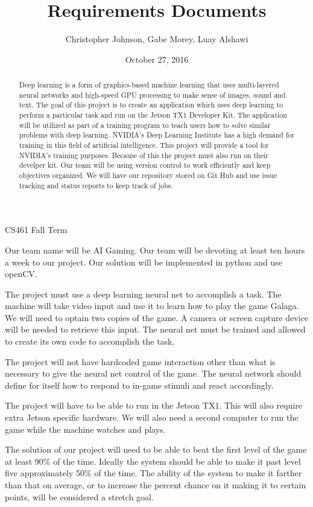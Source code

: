 \documentclass[letterpaper,10pt]{article}
\author{Christopher Johnson, Gabe Morey, Luay Alshawi}
\title{Requirements Documents}
\date{October 27, 2016}
\begin{document}
\begin{titlingpage}
\maketitle
CS461 Fall Term

\begin{abstract}
Deep learning is a form of graphics-based machine learning that uses multi-layered neural networks and high-speed
GPU processing to make sense of images, sound and text.
The goal of this project is to create an application which uses deep learning to perform a particular task and run on the Jetson TX1 Developer Kit.
The application will be utilized as part of a training program to teach users how to solve similar problems with deep learning. NVIDIA's Deep Learning Institute has a high demand for training in this field of artificial intelligence.
This project will provide a tool for NVIDIA's training purposes.
Because of this the project must also run on their develper kit.
Our team will be using version control to work efficiently and keep objectives organized.
We will have our repository stored on Git Hub and use issue tracking and status reports to keep track of jobs.
\end{abstract}

\end{titlingpage}
Our team name will be AI Gaming.
Our team will be devoting at least ten hours a week to our project.
Our solution will be implemented in python and use openCV.

The project must use a deep learning neural net to accomplish a task.
The machine will take video input and use it to learn how to play the game Galaga.
We will need to optain two copies of the game.
A camera or screen capture device will be needed to retrieve this input.
The neural net must be trained and allowed to create its own code to accomplish the task.

The project will not have hardcoded game interaction other than what is necessary to give the neural net control of the game.
The neural network should define for itself how to respond to in-game stimuli and react accordingly.

The project will have to be able to run in the Jetson TX1.
This will also require extra Jetson specific hardware.
We will also need a second computer to run the game while the machine watches and plays.

The solution of our project will need to be able to beat the first level of the game at least 90\% of the time.
Ideally the system should be able to make it past level five approximately 50\% of the time.
The ability of the system to make it farther than that on average, or to increase the percent chance on it making it to certain points, will be considered a stretch goal.
\end{document}
